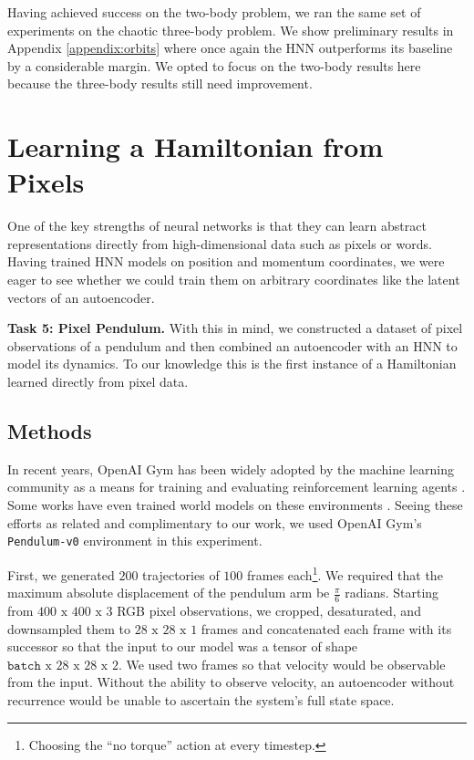 \documentclass{article}
\begin{document}
Having achieved success on the two-body problem, we ran the same set of experiments on the chaotic three-body problem. We show preliminary results in Appendix \ref{appendix:orbits} where once again the HNN outperforms its baseline by a considerable margin. We opted to focus on the two-body results here because the three-body results still need improvement.

\section{Learning a Hamiltonian from Pixels}   

One of the key strengths of neural networks is that they can learn abstract representations directly from high-dimensional data such as pixels or words. Having trained HNN models on position and momentum coordinates, we were eager to see whether we could train them on arbitrary coordinates like the latent vectors of an autoencoder.

\textbf{Task 5: Pixel Pendulum.} With this in mind, we constructed a dataset of pixel observations of a pendulum and then combined an autoencoder with an HNN to model its dynamics. To our knowledge this is the first instance of a Hamiltonian learned directly from pixel data.

\subsection{Methods}

In recent years, OpenAI Gym has been widely adopted by the machine learning community as a means for training and evaluating reinforcement learning agents \cite{Brockman2016OpenAI}. Some works have even trained world models on these environments \cite{Ha2018Recurrent,Hafner2018Learning}. Seeing these efforts as related and complimentary to our work, we used OpenAI Gym's \texttt{Pendulum-v0} environment in this experiment. 

First, we generated $200$ trajectories of $100$ frames each\footnote{Choosing the ``no torque'' action at every timestep.}. We required that the maximum absolute displacement of the pendulum arm be $\frac{\pi}{6}$ radians. Starting from $400\textrm{ x }400\textrm{ x }3$ RGB pixel observations, we cropped, desaturated, and downsampled them to $28\textrm{ x }28\textrm{ x }1$ frames and concatenated each frame with its successor so that the input to our model was a tensor of shape $\texttt{batch}\textrm{ x }28\textrm{ x }28\textrm{ x }2$. We used two frames so that velocity would be observable from the input. Without the ability to observe velocity, an autoencoder without recurrence would be unable to ascertain the system's full state space.
\end{document}
